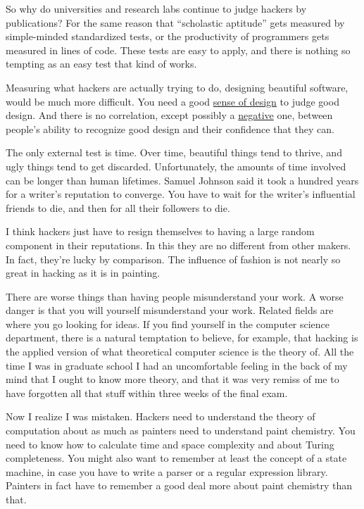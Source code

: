\documentclass[12pt]{book}
\begin{document}
So why do universities and research labs continue to judge hackers by
publications? For the same reason that ``scholastic aptitude'' gets
measured by simple-minded standardized tests, or the productivity of
programmers gets measured in lines of code. These tests are easy to
apply, and there is nothing so tempting as an easy test that kind of
works.

Measuring what hackers are actually trying to do, designing beautiful
software, would be much more difficult. You need a good
\href{taste.html}{sense of design} to judge good design. And there is no
correlation, except possibly a
\href{http://www.apa.org/journals/features/psp7761121.pdf}{negative}
one, between people's ability to recognize good design and their
confidence that they can.

The only external test is time. Over time, beautiful things tend to
thrive, and ugly things tend to get discarded. Unfortunately, the
amounts of time involved can be longer than human lifetimes. Samuel
Johnson said it took a hundred years for a writer's reputation to
converge. You have to wait for the writer's influential friends to die,
and then for all their followers to die.

I think hackers just have to resign themselves to having a large random
component in their reputations. In this they are no different from other
makers. In fact, they're lucky by comparison. The influence of fashion
is not nearly so great in hacking as it is in painting.

There are worse things than having people misunderstand your work. A
worse danger is that you will yourself misunderstand your work. Related
fields are where you go looking for ideas. If you find yourself in the
computer science department, there is a natural temptation to believe,
for example, that hacking is the applied version of what theoretical
computer science is the theory of. All the time I was in graduate school
I had an uncomfortable feeling in the back of my mind that I ought to
know more theory, and that it was very remiss of me to have forgotten
all that stuff within three weeks of the final exam.

Now I realize I was mistaken. Hackers need to understand the theory of
computation about as much as painters need to understand paint
chemistry. You need to know how to calculate time and space complexity
and about Turing completeness. You might also want to remember at least
the concept of a state machine, in case you have to write a parser or a
regular expression library. Painters in fact have to remember a good
deal more about paint chemistry than that.
\end{document}
